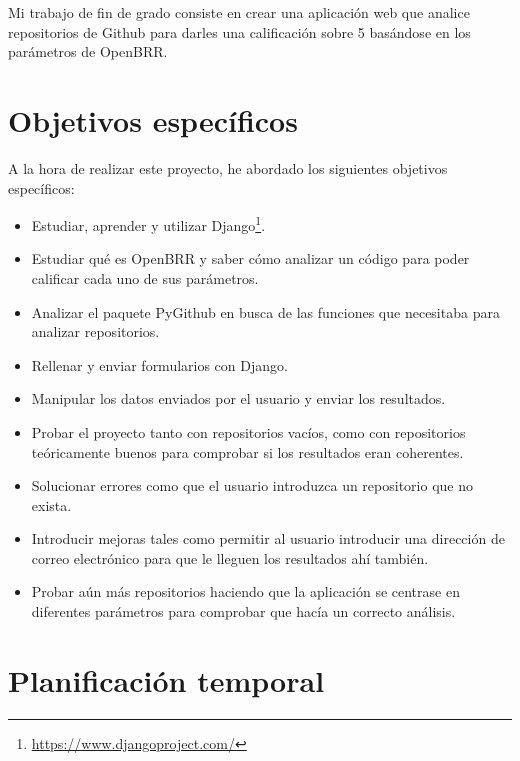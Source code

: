 \documentclass[a4paper, 12pt]{book}
\begin{document}
Mi trabajo de fin de grado consiste en crear una aplicación web que analice repositorios de Github para darles una calificación sobre 5 basándose en los parámetros de OpenBRR.


\section{Objetivos específicos}
\label{sec:objetivos-especificos}

A la hora de realizar este proyecto, he abordado los siguientes objetivos específicos:

\begin{itemize}
	\item Estudiar, aprender y utilizar Django\footnote{\url{https://www.djangoproject.com/}}.

	\item Estudiar qué es OpenBRR y saber cómo analizar un código para poder calificar cada uno de sus parámetros.
	
	\item Analizar el paquete PyGithub en busca de las funciones que necesitaba para analizar repositorios.

	\item Rellenar y enviar formularios con Django.

	\item Manipular los datos enviados por el usuario y enviar los resultados.

	\item Probar el proyecto tanto con repositorios vacíos, como con repositorios teóricamente buenos para comprobar si los resultados eran coherentes.

	\item Solucionar errores como que el usuario introduzca un repositorio que no exista.

	\item Introducir mejoras tales como permitir al usuario introducir una dirección de correo electrónico para que le lleguen los resultados ahí también.

	\item Probar aún más repositorios haciendo que la aplicación se centrase en diferentes parámetros para comprobar que hacía un correcto análisis.
\end{itemize}


\section{Planificación temporal}
\label{sec:planificacion-temporal}
\end{document}
